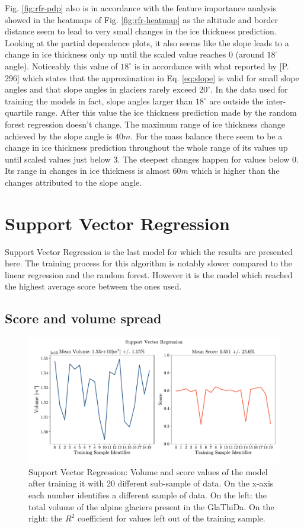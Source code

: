 Fig. \ref{fig:rfr-pdp} also is in accordance with the feature importance analysis showed in the heatmaps of Fig. \ref{fig:rfr-heatmap} as the altitude and border distance seem to lead to very small changes in the ice thickness prediction. Looking at the partial dependence plots, it also seems like the slope leads to a change in ice thickness only up until the scaled value reaches 0 (around $18^{\circ}$ angle). Noticeably this value of $18^{\circ}$ is in accordance with what reported by \citet{cuffey2010physics}[P. 296] which states that the approximation in Eq. \ref{eq:slope} is valid for small slope angles and that slope angles in glaciers rarely exceed $20^{\circ}$. In the data used for training the models in fact, slope angles larger than $18^{\circ}$ are outside the inter-quartile range. After this value the ice thickness prediction made by the random forest regression doesn't change. The maximum range of ice thickness change achieved by the slope angle is $40m$. For the mass balance there seem to be a change in ice thickness prediction throughout the whole range of its values up until scaled values just below 3. The steepest changes happen for values below 0. Its range in changes in ice thickness is almost $60m$ which is higher than the changes attributed to the slope angle.


\section{Support Vector Regression}\label{svr}
Support Vector Regression is the last model for which the results are presented here. The training process for this algorithm is notably slower compared to the linear regression and the random forest. However it is the model which reached the highest average score between the ones used. 

\subsection{Score and volume spread}\label{svr-score}

\begin{figure}[!tp]
	\centering		  
	\includegraphics[width=1.\textwidth]{figures/SVR_score.pdf}
	\caption{Support Vector Regression: Volume and score values of the model after training it with 20 different sub-sample of data. On the x-axis each number identifies a different sample of data. On the left: the total volume of the alpine glaciers present in the GlaThiDa. On the right: the $R^2$ coefficient for values left out of the training sample.}
	\label{fig:svr-score}
\end{figure}

